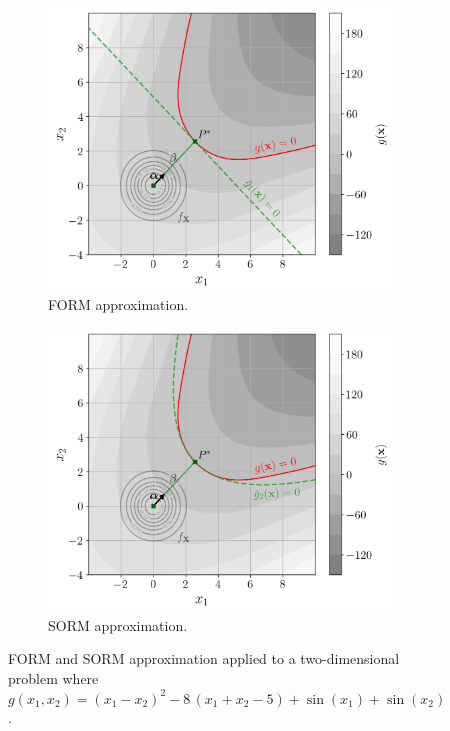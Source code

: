 \begin{figure}[ht]
    \centering
    \begin{subfigure}[b]{0.48\textwidth}
        \centering
        \includegraphics[width=\textwidth]{../numerical_experiments/chapter1/figures/reliability_FORM_illustration.png}
        \caption{FORM approximation.}
    \end{subfigure}
    \quad
    \begin{subfigure}[b]{0.48\textwidth}
        \centering
        \includegraphics[width=\textwidth]{../numerical_experiments/chapter1/figures/reliability_SORM_illustration.png}
        \caption{SORM approximation.}
    \end{subfigure}
       \caption{FORM and SORM approximation applied to a two-dimensional problem where $g(x_1, x_2)=(x_1 - x_2) ^ 2 - 8 \, (x_1 + x_2 - 5) + \sin(x_1) + \sin(x_2)$.}
       \label{fig:FORM_SORM_approx}
\end{figure}

